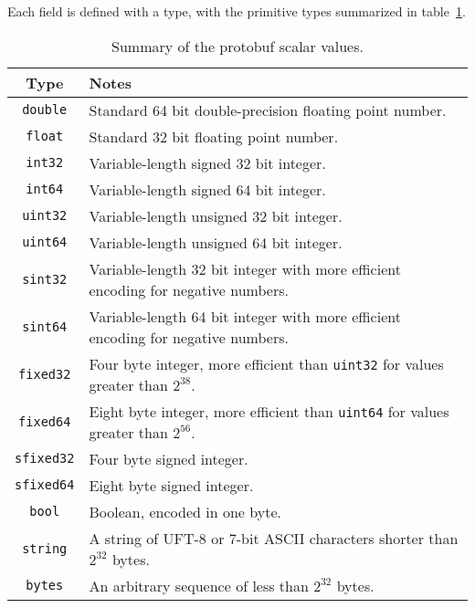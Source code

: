 \documentclass[11pt]{article}
\theoremstyle{definition}
\theoremstyle{plain}
\begin{document}
Each field is defined with a type, with the primitive types summarized in
table~\ref{tbl:proto-prim}.

\begin{table}[H]
	\centering
	\begin{tabular}{cl}
		\toprule
		Type              & Notes                                                    \\
		\midrule
		\texttt{double}   & Standard 64 bit double-precision floating point
		number.                                                                      \\
		\texttt{float}    & Standard 32 bit floating point number.                   \\
		\texttt{int32}    & Variable-length signed 32 bit integer.                   \\
		\texttt{int64}    & Variable-length signed 64 bit integer.                   \\
		\texttt{uint32}   & Variable-length unsigned 32 bit integer.                 \\
		\texttt{uint64}   & Variable-length unsigned 64 bit integer.                 \\
		\texttt{sint32}   & Variable-length 32 bit integer with more
		efficient encoding for negative numbers.                                     \\
		\texttt{sint64}   & Variable-length 64 bit integer with more efficient
		encoding for negative numbers.                                               \\
		\texttt{fixed32}  & Four byte integer, more efficient than \texttt{uint32}
		for values greater than $2^{38}$.                                            \\
		\texttt{fixed64}  & Eight byte integer, more efficient than \texttt{uint64}
		for values greater than $2^{56}$.                                            \\
		\texttt{sfixed32} & Four byte signed integer.                                \\
		\texttt{sfixed64} & Eight byte signed integer.                               \\
		\texttt{bool}     & Boolean, encoded in one byte.                            \\
		\texttt{string}   & A string of UFT-8 or 7-bit ASCII characters shorter than
		$2^{32}$ bytes.                                                              \\
		\texttt{bytes}    & An arbitrary sequence of less than $2^{32}$ bytes.       \\
		\bottomrule
	\end{tabular}
	\caption{Summary of the protobuf scalar values.}
	\label{tbl:proto-prim}
\end{table}
\end{document}
